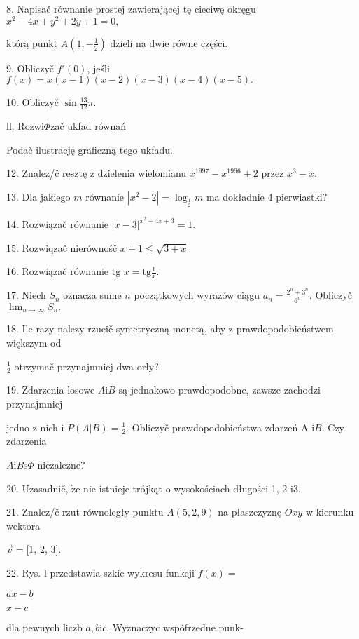 \documentclass[a4paper,12pt]{article}
\begin{document}
8. Napisač równanie prostej zawierającej tę cieciwę okręgu $x^{2}-4x+y^{2}+2y+1 =0,$

którą punkt $A(1,-\displaystyle \frac{1}{2})$ dzieli na dwie równe części.

9. Obliczyč $f'(0)$, jeśli $f(x)=x(x-1)(x-2)(x-3)(x-4)(x-5).$

10. Obliczyč $\displaystyle \sin\frac{13}{12}\pi.$

ll. Rozwi$\Phi$zač ukfad równań 

Podač ilustrację graficzną tego ukfadu.

12. Znalez/č resztę z dzielenia wielomianu $x^{1997}-x^{1996}+2$ przez $x^{3}-x.$

13. Dla jakiego $m$ równanie $|x^{2}-2|=\log_{\frac{1}{2}}m$ ma dokładnie 4 pierwiastki?

14. Rozwiązač równanie $|x-3|^{x^{2}-4x+3}=1.$

15. Rozwiqzač nierównośč $x+1\leq\sqrt{3+x}.$

16. Rozwiązač równanie tg $x=\displaystyle \mathrm{t}\mathrm{g}\frac{1}{x}.$

17. Niech $S_{n}$ oznacza sume $n$ początkowych wyrazów ciągu $a_{n}=\displaystyle \frac{2^{n}+3^{n}}{6^{n}}.$ Obliczyč $\displaystyle \lim_{n\rightarrow\infty}S_{n}.$




18. Ile razy nalezy rzucič symetryczną monetą, aby z prawdopodobieństwem większym od

$\displaystyle \frac{1}{2}$ otrzymač przynajmniej dwa orły?

19. Zdarzenia losowe $A\mathrm{i}B$ są jednakowo prawdopodobne, zawsze zachodzi przynajmniej

jedno z nich i $P(A|B)=\displaystyle \frac{1}{2}$. Obliczyč prawdopodobieństwa zdarzeń A $\mathrm{i}B$. Czy zdarzenia

$ A\mathrm{i}B\mathrm{s}\Phi$ niezalezne?

20. Uzasadnič, $\dot{\mathrm{z}}\mathrm{e}$ nie istnieje trójkąt o wysokościach długości 1, 2 $\mathrm{i}3.$

21. Znalez/č rzut równoległy punktu $A(5,2,9)$ na płaszczyznę $Oxy$ w kierunku wektora

$\vec{v}=[1$, 2, 3$].$

22. Rys. l przedstawia szkic wykresu funkcji $f(x)=$

$ax-b$

$x-c$

dla pewnych liczb $a, b\mathrm{i}c$. Wyznaczyc wspófrzedne punk-
\end{document}
